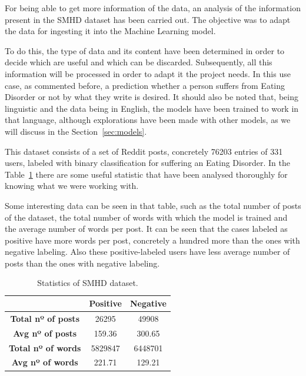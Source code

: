 
For being able to get more information of the data, an analysis of the information present in the SMHD dataset has been carried out. The objective was to adapt the data for ingesting it into the Machine Learning model. 

To do this, the type of data and its content have been determined in order to decide which are useful and which can be discarded. Subsequently, all this information will be processed in order to adapt it the project needs. In this use case, as commented before, a prediction whether a person suffers from Eating Disorder or not by what they write is desired. It should also be noted that, being linguistic and the data being in English, the models have been trained to work in that language, although explorations have been made with other models, as we will discuss in the Section~\ref{sec:models}.

This dataset consists of a set of Reddit posts, concretely 76203 entries of 331 users, labeled with binary classification for suffering an Eating Disorder. In the Table~\ref{tab:SMHDstatistics} there are some useful statistic that have been analysed thoroughly for knowing what we were working with. 

Some interesting data can be seen in that table, such as the total number of posts of the dataset, the total number of words with which the model is trained and the average number of words per post. It can be seen that the cases labeled as positive have more words per post, concretely a hundred more than the ones with negative labeling. Also these positive-labeled users have less average number of posts than the ones with negative labeling.

\begin{table}[htp]
\centering
\begin{tabular}{|c|c|c|}
\hline
                           & \textbf{Positive} & \textbf{Negative} \\ \hline
\textbf{Total nº of posts} & 26295             & 49908             \\ \hline
\textbf{Avg nº of posts}   & 159.36            & 300.65            \\ \hline
\textbf{Total nº of words} & 5829847           & 6448701           \\ \hline
\textbf{Avg nº of words}   & 221.71            & 129.21            \\ \hline
\end{tabular}
\caption{Statistics of SMHD dataset.}
\label{tab:SMHDstatistics}
\end{table}

